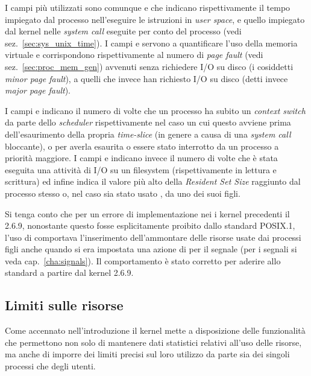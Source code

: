 I campi più utilizzati sono comunque  e  che
indicano rispettivamente il tempo impiegato dal processo nell'eseguire le
istruzioni in \textit{user space}, e quello impiegato dal kernel nelle
\textit{system call} eseguite per conto del processo (vedi
sez.~\ref{sec:sys_unix_time}). I campi  e 
servono a quantificare l'uso della memoria virtuale e corrispondono
rispettivamente al numero di \textit{page fault} (vedi
sez.~\ref{sec:proc_mem_gen}) avvenuti senza richiedere I/O su disco (i
cosiddetti \textit{minor page fault}), a quelli che invece han richiesto I/O
su disco (detti invece \textit{major page
  fault}).%

I campi  e  indicano il numero di volte che un
processo ha subito un \textit{context switch} da parte dello
\textit{scheduler} rispettivamente nel caso un cui questo avviene prima
dell'esaurimento della propria \textit{time-slice} (in genere a causa di una
\textit{system call} bloccante), o per averla esaurita o essere stato
interrotto da un processo a priorità maggiore. I campi  e
 indicano invece il numero di volte che è stata eseguita una
attività di I/O su un filesystem (rispettivamente in lettura e scrittura) ed
infine  indica il valore più alto della \textit{Resident Set
  Size} raggiunto dal processo stesso o, nel caso sia stato usato
, da uno dei suoi figli.
 
Si tenga conto che per un errore di implementazione nei i kernel precedenti il
2.6.9, nonostante questo fosse esplicitamente proibito dallo standard POSIX.1,
l'uso di  comportava l'inserimento dell'ammontare
delle risorse usate dai processi figli anche quando si era impostata una
azione di  per il segnale  (per i segnali si
veda cap.~\ref{cha:signals}). Il comportamento è stato corretto per aderire
allo standard a partire dal kernel 2.6.9.


\subsection{Limiti sulle risorse}
\label{sec:sys_resource_limit}

Come accennato nell'introduzione il kernel mette a disposizione delle
funzionalità che permettono non solo di mantenere dati statistici relativi
all'uso delle risorse, ma anche di imporre dei limiti precisi sul loro
utilizzo da parte sia dei singoli processi che degli utenti.

